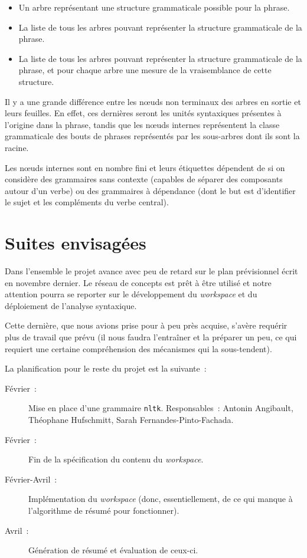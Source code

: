 \documentclass[a4paper, 12pt]{article}
\newcommand{\pyt}[1]{\texttt{#1}}%
\begin{document}
\begin{itemize}
	\item Un arbre représentant une structure grammaticale possible pour la phrase.
	\item La liste de tous les arbres pouvant représenter la structure grammaticale de la phrase.
	\item La liste de tous les arbres pouvant représenter la structure grammaticale de la phrase, et pour chaque arbre une mesure de la vraisemblance de cette structure.
\end{itemize}

Il y a une grande différence entre les n\oe{}uds non terminaux des arbres en sortie et leurs feuilles. En effet, ces dernières seront les unités syntaxiques présentes à l'origine dans la phrase, tandis que les n\oe{}uds internes représentent la classe grammaticale des bouts de phrases représentés par les sous-arbres dont ils sont la racine.


Les n\oe{}uds internes sont en nombre fini et leurs étiquettes dépendent de si on considère des grammaires sans contexte (capables de séparer des composants autour d'un verbe) ou des grammaires à dépendance (dont le but est d'identifier le sujet et les compléments du verbe central).


\section{Suites envisagées}

Dans l'ensemble le projet avance avec peu de retard sur le plan prévisionnel écrit en novembre dernier. Le réseau de concepts est prêt à être utilisé et notre attention pourra se reporter sur le développement du \textit{workspace} et du déploiement de l'analyse syntaxique.

Cette dernière, que nous avions prise pour à peu près acquise, s'avère requérir plus de travail que prévu (il nous faudra l'entraîner et la préparer un peu, ce qui requiert une certaine compréhension des mécanismes qui la sous-tendent).

La planification pour le reste du projet est la suivante~:
\begin{description}
	\item[Février~: ]Mise en place d'une grammaire \pyt{nltk}. Responsables~: Antonin Angibault, Théophane Hufschmitt, Sarah Fernandes-Pinto-Fachada.
	\item[Février~: ]Fin de la spécification du contenu du \textit{workspace}.
	\item[Février-Avril~: ]Implémentation du \textit{workspace} (donc, essentiellement, de ce qui manque à l'algorithme de résumé pour fonctionner).
	\item[Avril~: ]Génération de résumé et évaluation de ceux-ci.
\end{description}
\end{document}
